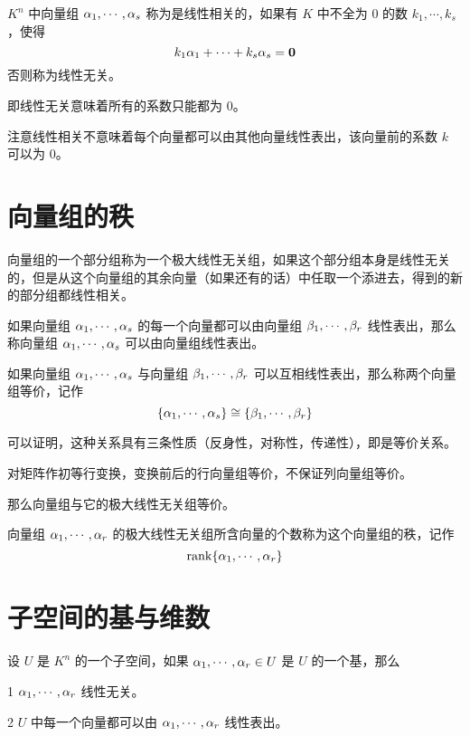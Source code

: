 \begin{definition}
	$K^n$ 中向量组 $\alpha_1,\cdots,\alpha_s$ 称为是线性相关的，如果有 $K$ 中不全为 $0$ 的数 $k_1,\cdots,k_s$，使得
	\[k_1\alpha_1+\cdots+k_s\alpha_s=\boldsymbol{0}\]
	否则称为线性无关。
\end{definition}

即线性无关意味着所有的系数只能都为 $0$。

注意线性相关不意味着每个向量都可以由其他向量线性表出，该向量前的系数 $k$ 可以为 $0$。

\section{向量组的秩}

\begin{definition}[极大线性无关组]
	向量组的一个部分组称为一个极大线性无关组，如果这个部分组本身是线性无关的，但是从这个向量组的其余向量（如果还有的话）中任取一个添进去，得到的新的部分组都线性相关。
\end{definition}

如果向量组 $\alpha_1,\cdots,\alpha_s$ 的每一个向量都可以由向量组 $\beta_1,\cdots,\beta_r$ 线性表出，那么称向量组 $\alpha_1,\cdots,\alpha_s$ 可以由向量组线性表出。

\begin{definition}
	如果向量组 $\alpha_1,\cdots,\alpha_s$ 与向量组 $\beta_1,\cdots,\beta_r$ 可以互相线性表出，那么称两个向量组等价，记作
	\[\{\alpha_1,\cdots,\alpha_s\} \cong \{\beta_1,\cdots,\beta_r\}\]
\end{definition}

可以证明，这种关系具有三条性质（反身性，对称性，传递性），即是等价关系。

对矩阵作初等行变换，变换前后的行向量组等价，不保证列向量组等价。

那么向量组与它的极大线性无关组等价。

\begin{definition}
	向量组 $\alpha_1,\cdots,\alpha_r$ 的极大线性无关组所含向量的个数称为这个向量组的秩，记作
	\[\operatorname{rank}\{\alpha_1,\cdots,\alpha_r\}\]
\end{definition}

\section{子空间的基与维数}

\begin{definition}
	设 $U$ 是 $K^n$ 的一个子空间，如果 $\alpha_1,\cdots,\alpha_r\in U$ 是 $U$ 的一个基，那么

	\num{1} $\alpha_1,\cdots,\alpha_r$ 线性无关。

	\num{2} $U$ 中每一个向量都可以由 $\alpha_1,\cdots,\alpha_r$ 线性表出。
\end{definition}

